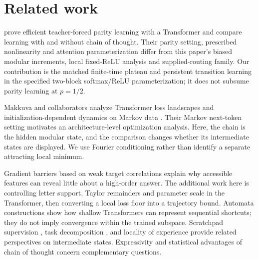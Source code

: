 \section{Related work}\label{sec:related}
\citet{kim2024parity} prove efficient teacher-forced parity learning with a Transformer and compare learning with and without chain of thought. Their parity setting, prescribed nonlinearity and attention parameterization differ from this paper's biased modular increments, local fixed-ReLU analysis and supplied-routing family. Our contribution is the matched finite-time plateau and persistent transition learning in the specified two-block softmax/ReLU parameterization; it does not subsume parity learning at $p=1/2$.

Makkuva and collaborators analyze Transformer loss landscapes and initialization-dependent dynamics on Markov data \citep{makkuva2025attention,makkuva2024local}. Their Markov next-token setting motivates an architecture-level optimization analysis. Here, the chain is the hidden modular state, and the comparison changes whether its intermediate states are displayed. We use Fourier conditioning rather than identify a separate attracting local minimum.

Gradient barriers based on weak target correlations \citep{shalevshwartz2017failures,abbe2025parities} explain why accessible features can reveal little about a high-order answer. The additional work here is controlling letter support, Taylor remainders and parameter scale in the Transformer, then converting a local loss floor into a trajectory bound. Automata constructions \citep{liu2023automata} show how shallow Transformers can represent sequential shortcuts; they do not imply convergence within the trained subspace. Scratchpad supervision \citep{nye2021scratchpads}, task decomposition \citep{wies2023subtask}, and locality of experience \citep{prystawski2023think} provide related perspectives on intermediate states. Expressivity and statistical advantages of chain of thought \citep{merrill2024expressive,wen2024sparse} concern complementary questions.

